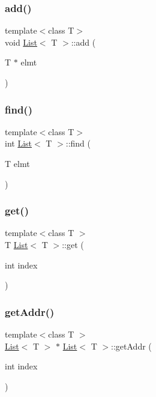 \subsubsection{\texorpdfstring{add()}{add()}}
{\footnotesize\ttfamily template$<$class T$>$ \\
void \mbox{\hyperlink{class_list}{List}}$<$ T $>$\+::add (\begin{DoxyParamCaption}\item[{T $\ast$}]{elmt }\end{DoxyParamCaption})}

\mbox{\label{class_list_afcc0ad2940d9efbd8b487bc40e3f0067}} 
\subsubsection{\texorpdfstring{find()}{find()}}
{\footnotesize\ttfamily template$<$class T$>$ \\
int \mbox{\hyperlink{class_list}{List}}$<$ T $>$\+::find (\begin{DoxyParamCaption}\item[{T}]{elmt }\end{DoxyParamCaption})}

\mbox{\label{class_list_a8674ced74b669f6c49292a4545c5b1e3}} 
\subsubsection{\texorpdfstring{get()}{get()}}
{\footnotesize\ttfamily template$<$class T $>$ \\
T \mbox{\hyperlink{class_list}{List}}$<$ T $>$\+::get (\begin{DoxyParamCaption}\item[{int}]{index }\end{DoxyParamCaption})}

\mbox{\label{class_list_ad34f9546e1bee20ecf23a985e34c3fb8}} 
\subsubsection{\texorpdfstring{get\+Addr()}{getAddr()}}
{\footnotesize\ttfamily template$<$class T $>$ \\
\mbox{\hyperlink{class_list}{List}}$<$ T $>$ $\ast$ \mbox{\hyperlink{class_list}{List}}$<$ T $>$\+::get\+Addr (\begin{DoxyParamCaption}\item[{int}]{index }\end{DoxyParamCaption})}

